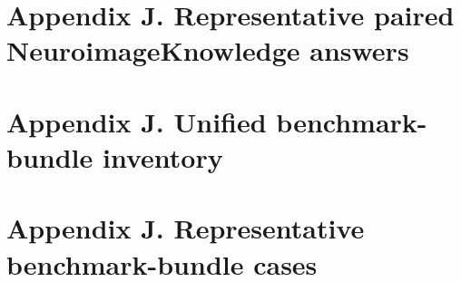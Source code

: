 \documentclass[pdflatex,sn-mathphys-num]{sn-jnl}
\begin{document}
\section{\texorpdfstring{\textbf{Appendix J. Representative paired NeuroimageKnowledge answers}}{Appendix J. Representative paired NeuroimageKnowledge answers}}

\clearpage
\section{\texorpdfstring{\textbf{Appendix J. Unified benchmark-bundle inventory}}{Appendix J. Unified benchmark-bundle inventory}}

\clearpage
\section{\texorpdfstring{\textbf{Appendix J. Representative benchmark-bundle cases}}{Appendix J. Representative benchmark-bundle cases}}

\end{document}
